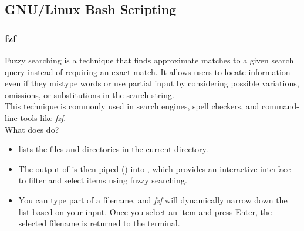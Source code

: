 \documentclass[titlepage]{article}
\begin{document}
\subsection{GNU/Linux Bash Scripting}
\subsubsection{fzf}
Fuzzy searching is a technique that finds approximate matches to a given search query instead of requiring an exact match. It allows users to locate information even if they mistype words or use partial input by considering possible variations, omissions, or substitutions in the search string.
\\This technique is commonly used in search engines, spell checkers, and command-line tools like \textit{fzf}.
\vspace{8pt}
\\What does  do?
\begin{itemize}
\item {} lists the files and directories in the current directory.
\item The output of  is then piped (\tcbox[inline]{|}) into , which provides an interactive interface to filter and select items using fuzzy searching.
\item You can type part of a filename, and \textit{fzf} will dynamically narrow down the list based on your input. Once you select an item and press Enter, the selected filename is returned to the terminal.
\end{itemize}
\end{document}

